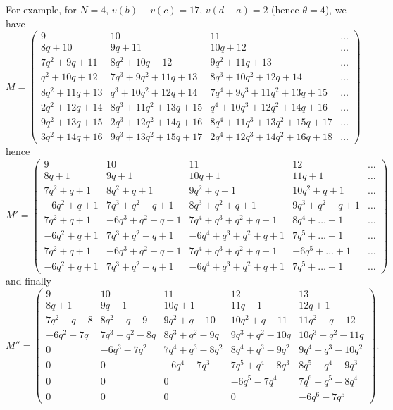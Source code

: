 \begin{example}
  For example, for $N = 4$, $v(b)+v(c)=17$, $v(d-a) = 2$ (hence $\theta=4$), we have
  \[
    M = \begin{pmatrix}
    9 & 10 & 11 & \dots \\
    8q + 10 & 9q + 11 & 10q + 12 & \dots \\
    7q^{2} + 9q + 11 & 8q^{2} + 10q + 12 & 9q^{2} + 11q + 13 & \dots \\
    q^{2} + 10q + 12 & 7q^{3} + 9q^{2} + 11q + 13 & 8q^{3} + 10q^{2} + 12q + 14 & \dots \\
    8q^{2} + 11q + 13 & q^{3} + 10q^{2} + 12q + 14 & 7q^{4} + 9q^{3} + 11q^{2} + 13q + 15 & \dots \\
    2q^{2} + 12q + 14 & 8q^{3} + 11q^{2} + 13q + 15 & q^{4} + 10q^{3} + 12q^{2} + 14q + 16 & \dots \\
    9q^{2} + 13q + 15 & 2q^{3} + 12q^{2} + 14q + 16 & 8q^{4} + 11q^{3} + 13q^{2} + 15q + 17 & \dots \\
    3q^{2} + 14q + 16 & 9q^{3} + 13q^{2} + 15q + 17 & 2q^{4} + 12q^{3} + 14q^{2} + 16q + 18 & \dots
    \end{pmatrix}
  \]
  hence
  \[ M' = \begin{pmatrix}
    9 & 10 & 11 & 12 & \dots \\
    8q + 1 & 9q + 1 & 10q + 1 & 11q + 1 & \dots \\
    7q^{2} + q + 1 & 8q^{2} + q + 1 & 9q^{2} + q + 1 & 10q^{2} + q + 1 & \dots \\
    -6q^{2} + q + 1 & 7q^{3} + q^{2} + q + 1 & 8q^{3} + q^{2} + q + 1 & 9q^{3} + q^{2} + q + 1 & \dots \\
    7q^{2} + q + 1 & -6q^{3} + q^{2} + q + 1 & 7q^{4} + q^{3} + q^{2} + q + 1 & 8q^{4} + \dots + 1 & \dots \\
    -6q^{2} + q + 1 & 7q^{3} + q^{2} + q + 1 & -6q^{4} + q^{3} + q^{2} + q + 1 & 7q^{5} + \dots + 1 & \dots \\
    7q^{2} + q + 1 & -6q^{3} + q^{2} + q + 1 & 7q^{4} + q^{3} + q^{2} + q + 1 & -6q^{5} + \dots + 1 & \dots \\
    -6q^{2} + q + 1 & 7q^{3} + q^{2} + q + 1 & -6q^{4} + q^{3} + q^{2} + q + 1 & 7q^{5} + \dots + 1 & \dots
    \end{pmatrix}
  \]
  and finally
  \[
    M'' = \begin{pmatrix}
    9 & 10 & 11 & 12 & 13 \\
    8q + 1 & 9q + 1 & 10q + 1 & 11q + 1 & 12q + 1 \\
    7q^{2} + q - 8 & 8q^{2} + q - 9 & 9q^{2} + q - 10 & 10q^{2} + q - 11 & 11q^{2} + q - 12 \\
    -6q^{2} - 7q & 7q^{3} + q^{2} - 8q & 8q^{3} + q^{2} - 9q & 9q^{3} + q^{2} - 10q & 10q^{3} + q^{2} - 11q \\
    0 & -6q^{3} - 7q^{2} & 7q^{4} + q^{3} - 8q^{2} & 8q^{4} + q^{3} - 9q^{2} & 9q^{4} + q^{3} - 10q^{2} \\
    0 & 0 & -6q^{4} - 7q^{3} & 7q^{5} + q^{4} - 8q^{3} & 8q^{5} + q^{4} - 9q^{3} \\
    0 & 0 & 0 & -6q^{5} - 7q^{4} & 7q^{6} + q^{5} - 8q^{4} \\
    0 & 0 & 0 & 0 & -6q^{6} - 7q^{5}
    \end{pmatrix}.
  \]
\end{example}
